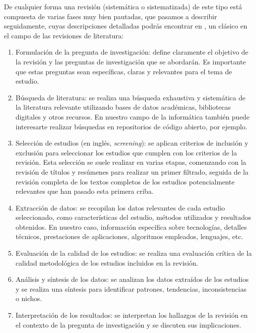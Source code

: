 De cualquier forma una revisión (sistemática o sistematizada) de este tipo está compuesta de varias fases muy bien pautadas, que pasamos a describir seguidamente, cuyas descripciones detalladas podrás encontrar en  \cite{booth2021a}, un clásico en el campo de las revisiones de literatura:

\begin{enumerate}
\item Formulación de la pregunta de investigación: define claramente el objetivo de la revisión y las preguntas de investigación que se abordarán. Es importante que estas preguntas sean específicas, claras y relevantes para el tema de estudio.

\item Búsqueda de literatura: se realiza una búsqueda exhaustiva y sistemática de la literatura relevante utilizando bases de datos académicas, bibliotecas digitales y otros recursos. En nuestro campo de la informática también puede interesarte realizar búsquedas en repositorios de código abierto, por ejemplo.

\item Selección de estudios (en inglés, \textit{screening}): se aplican criterios de inclusión y exclusión para seleccionar los estudios que cumplen con los criterios de la revisión. Esta selección se suele realizar en varias etapas, comenzando con la revisión de títulos y resúmenes para realizar un primer filtrado, seguida de la revisión completa de los textos completos de los estudios potencialmente relevantes que han pasado esta primera criba.

\item Extracción de datos: se recopilan los datos relevantes de cada estudio seleccionado, como características del estudio, métodos utilizados y resultados obtenidos. En nuestro caso, información específica sobre tecnologías, detalles técnicos, prestaciones de aplicaciones, algoritmos empleados, lenguajes, etc.

\item Evaluación de la calidad de los estudios: se realiza una evaluación crítica de la calidad metodológica de los estudios incluidos en la revisión.

\item Análisis y síntesis de los datos: se analizan los datos extraídos de los estudios y se realiza una síntesis para identificar patrones, tendencias, inconsistencias o nichos.

\item Interpretación de los resultados: se interpretan los hallazgos de la revisión en el contexto de la pregunta de investigación y se discuten sus implicaciones.


\end{enumerate}
